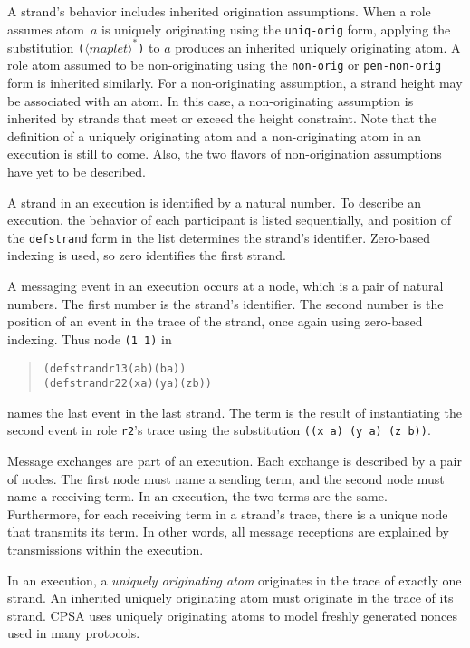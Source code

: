\documentclass[12pt]{article}
\newcommand{\nterm}[1]{\ensuremath{\langle\mathit{#1}\rangle}}
\newcommand{\nterms}[1]{\ensuremath{\nterm{#1}^\ast}}
\begin{document}
A strand's behavior includes inherited origination assumptions.  When
a role assumes atom~$a$ is uniquely originating using the
\texttt{uniq-orig} form, applying the substitution
\texttt{(\nterms{maplet})} to $a$ produces an inherited uniquely
originating atom.  A role atom assumed to be non-originating using the
\texttt{non-orig} or \texttt{pen-non-orig} form is inherited
similarly.  For a non-originating assumption, a strand height may be
associated with an atom.  In this case, a non-originating assumption
is inherited by strands that meet or exceed the height constraint.
Note that the definition of a uniquely originating atom and a
non-originating atom in an execution is still to come.  Also, the two
flavors of non-origination assumptions have yet to be described.

A strand in an execution is identified by a natural number.  To
describe an execution, the behavior of each participant is listed
sequentially, and position of the \texttt{defstrand} form in the list
determines the strand's identifier.  Zero-based indexing is used,
so zero identifies the first strand.

A messaging event in an execution occurs at a node, which is a pair of
natural numbers.  The first number is the strand's identifier.  The
second number is the position of an event in the trace of the
strand, once again using zero-based indexing.  Thus node \texttt{(1~1)}
in
\begin{quote}
\begin{alltt}
(defstrand r1 3 (a b) (b a))
(defstrand r2 2 (x a) (y a) (z b))
\end{alltt}
\end{quote}
names the last event in the last strand.  The term is the
result of instantiating the second event in role \texttt{r2}'s
trace using the substitution \texttt{((x a) (y a) (z b))}.

Message exchanges are part of an execution.  Each exchange is
described by a pair of nodes.  The first node must name a sending
term, and the second node must name a receiving term.  In an
execution, the two terms are the same.  Furthermore, for each
receiving term in a strand's trace, there is a unique node that
transmits its term.  In other words, all message receptions are
explained by transmissions within the execution.

In an execution, a \emph{uniquely originating atom} originates in the
trace of exactly one strand.  An inherited uniquely originating atom
must originate in the trace of its strand.  CPSA uses uniquely
originating atoms to model freshly generated nonces used in many
protocols.
\end{document}
